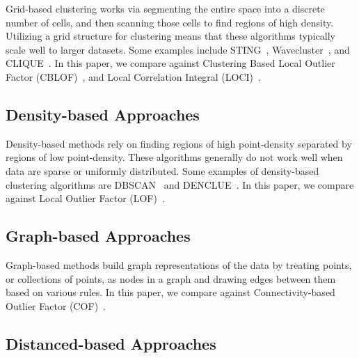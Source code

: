 Grid-based clustering works via segmenting the entire space into a discrete number of cells, and then scanning those cells to find regions of high density.
Utilizing a grid structure for clustering means that these algorithms typically scale well to larger datasets.
Some examples include
STING~\cite{wang1997sting},
Wavecluster~\cite{sheikholeslami2000wavecluster}, and
CLIQUE~\cite{agrawal1998automatic}. In this paper, we compare against Clustering Based Local Outlier Factor (CBLOF)~\cite{he2003cblof}, and
Local Correlation Integral (LOCI)~\cite{papadimitriou2003loci}.



\subsection{Density-based Approaches}
\label{subsec:introduction:density-based-approaches}

Density-based methods rely on finding regions of high point-density separated by regions of low point-density.
These algorithms generally do not work well when data are sparse or uniformly distributed.
Some examples of density-based clustering algorithms are
DBSCAN~\cite{ester1996density} and
DENCLUE~\cite{hinneburg1998efficient}.
In this paper, we compare against Local Outlier Factor (LOF)~\cite{breunig2000lof}.



\subsection{Graph-based Approaches}
\label{subsec:introduction:graph-based-approaches}

Graph-based methods build graph representations of the data by treating points, or collections of points, as nodes in a graph and drawing edges between them based on various rules. In this paper, we compare against Connectivity-based Outlier Factor (COF)~\cite{tang2002cof}.



\subsection{Distanced-based Approaches}
\label{subsec:related-works:distanced-based-approaches}

